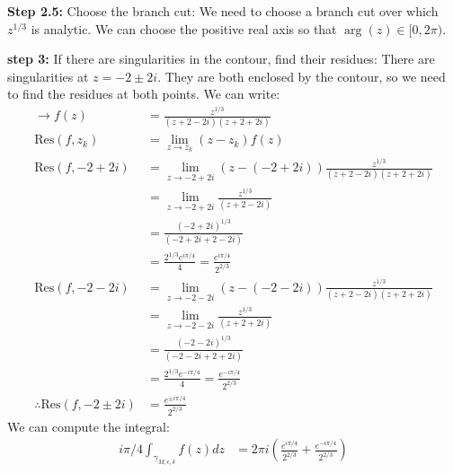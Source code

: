 \begin{example}
    \textbf{Step 2.5:} Choose the branch cut:
    We need to choose a branch cut over which $z^{1/3}$ is analytic. We can choose the positive real axis so that $\arg(z) \in [0, 2\pi)$.

    \textbf{step 3:} If there are singularities in the contour, find their residues:
    There are singularities at $z = -2 \pm 2i$. They are both enclosed by the contour, so we need to find the residues at both points. We can write:
    \begin{align*}
        \rightarrow f(z)                   & = \frac{z^{1/3}}{(z + 2 - 2i)(z + 2 + 2i)}                                      \\
        \text{Res}(f,z_k)                  & = \lim_{z \to z_k} (z - z_k) f(z)                                               \\
        \text{Res}(f,-2 + 2i)              & = \lim_{z \to -2 + 2i} (z - (-2 + 2i)) \frac{z^{1/3}}{(z + 2 - 2i)(z + 2 + 2i)} \\
                                           & = \lim_{z \to -2 + 2i} \frac{z^{1/3}}{(z + 2 - 2i)}                             \\
                                           & = \frac{(-2 + 2i)^{1/3}}{(-2 + 2i + 2 - 2i)}                                    \\
                                           & = \frac{2^{1/3}e^{i\pi/4}}{4} = \frac{e^{i\pi/4}}{2^{2/3}}                      \\
        \text{Res}(f,-2 - 2i)              & = \lim_{z \to -2 - 2i} (z - (-2 - 2i)) \frac{z^{1/3}}{(z + 2 - 2i)(z + 2 + 2i)} \\
                                           & = \lim_{z \to -2 - 2i} \frac{z^{1/3}}{(z + 2 + 2i)}                             \\
                                           & = \frac{(-2 - 2i)^{1/3}}{(-2 - 2i + 2 + 2i)}                                    \\
                                           & = \frac{2^{1/3}e^{-i\pi/4}}{4} = \frac{e^{-i\pi/4}}{2^{2/3}}                    \\
        \therefore \text{Res}(f,-2 \pm 2i) & = \frac{e^{\pm i\pi/4}}{2^{2/3}}
    \end{align*}
    We can compute the integral:
    \begin{align*}
        i\pi/4\int_{\gamma_{M,\epsilon,\delta}} f(z)dz & = 2\pi i \left( \frac{e^{i\pi/4}}{2^{2/3}} + \frac{e^{-i\pi/4}}{2^{2/3}} \right) \\

\end{align*}
\end{example}
